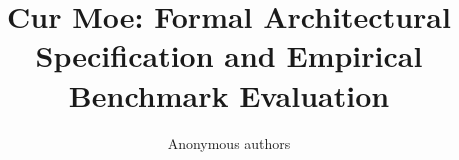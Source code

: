\title{\textbf{Cur Moe: Formal Architectural Specification and Empirical Benchmark Evaluation}}

\author{Anonymous authors}
